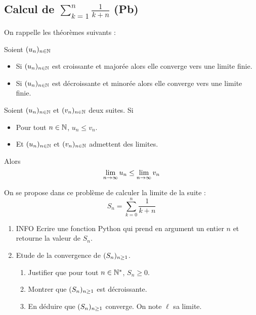 \documentclass[a4paper, 11pt]{article}
\author{Olivier Glorieux}
\begin{document}
\subsection{Calcul de $\sum_{k=1}^n \frac{1}{k+n}$ (Pb)}



\begin{probleme}
On rappelle les théorèmes suivants : 


\begin{theorem}
    Soient  $(u_n)_{n\in \mathbb{N}}$ \begin{itemize}
        \item Si  $(u_n)_{n\in \mathbb{N}}$ est   croissante et majorée alors elle converge vers une limite finie. 
        \item Si  $(u_n)_{n\in \mathbb{N}}$ est   décroissante et minorée alors elle converge vers une limite finie. 
    \end{itemize}
    
  
\end{theorem}

\begin{theorem}
    Soient  $(u_n)_{n\in \mathbb{N}}$ et $(v_n)_{n\in \mathbb{N}}$ deux suites. Si
\begin{itemize}
\item Pour tout $n\in \mathbb{N} $, $u_n\leq v_n$.
\item  Et $(u_n)_{n\in \mathbb{N}}$ et $(v_n)_{n\in \mathbb{N}}$ admettent des limites.
\end{itemize} 
Alors 
$$\lim_{n\rightarrow \infty} u_n \leq \lim_{n\rightarrow \infty} v_n$$

\end{theorem}




On se propose dans ce problème de calculer la limite de la  suite : 
$$S_n=\sum_{k=0}^{n} \frac{1}{k+n}$$


\begin{enumerate}
\item INFO Ecrire une fonction Python qui prend en argument un entier $n$ et retourne la valeur de $S_n$.
\item Etude de la convergence de $(S_n)_{n\geq 1}$.
\begin{enumerate}
\item Justifier que pour tout $n\in \mathbb{N}^*$, $S_n \geq 0$.
\item Montrer que  $(S_n)_{n\geq 1}$ est décroissante.
\item En déduire que $(S_n)_{n\geq 1}$ converge.  On note $\ell $ sa limite. 
\end{enumerate}


\end{enumerate}
\end{probleme}
\end{document}
